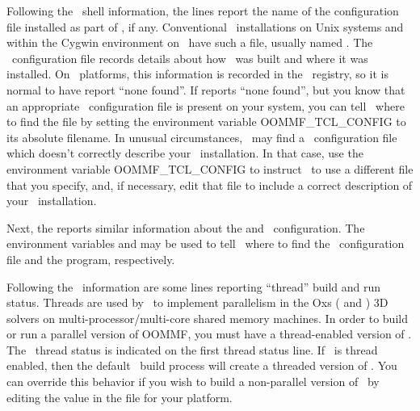 Following the \Tcl\ shell information, the  lines
report the name of the configuration file installed as part of \Tcl, if
any.  Conventional \Tcl\ installations on Unix systems and within the
Cygwin environment on
\Windows\ have such a file, usually named .  The
\Tcl\ configuration file records details about how \Tcl\ was built and
where it was installed.  On \Windows\ platforms, this information is
recorded in the
\Windows\ registry, so
it is normal to have  report ``none found''.  If
 reports ``none found'', but you know that an
appropriate \Tcl\ configuration file is present on your system, you can
tell \OOMMF\ where to find the file by setting the environment variable
OOMMF\_TCL\_CONFIG to
its absolute filename.  In unusual circumstances, \OOMMF\ may find a
\Tcl\ configuration file which doesn't correctly describe your
\Tcl\ installation.  In that case, use the environment variable
OOMMF\_TCL\_CONFIG to instruct \OOMMF\ to use a different file that you
specify, and, if necessary, edit that file to include a correct
description of your \Tcl\ installation.

Next, the  reports similar information about the
 and \Tk\ configuration.  The environment variables
and  may be
used to tell \OOMMF\ where to find the \Tk\ configuration file and the
 program, respectively.

Following the \Tk\ information are some lines reporting ``thread'' build
and run status. Threads are used by \OOMMF\ to implement parallelism in
the Oxs ( and ) 3D solvers on
multi-processor/multi-core shared memory machines.  In order to build or
run a parallel version of OOMMF, you must have a thread-enabled version
of \Tcl.  The \Tcl\ thread status is indicated on the first thread
status line.  If \Tcl\ is thread enabled, then the default \OOMMF\ build
process will create a threaded version of \OOMMF.  You can override this
behavior if you wish to build a non-parallel version of \OOMMF\ by
editing the
 value in
the  file for your platform.

